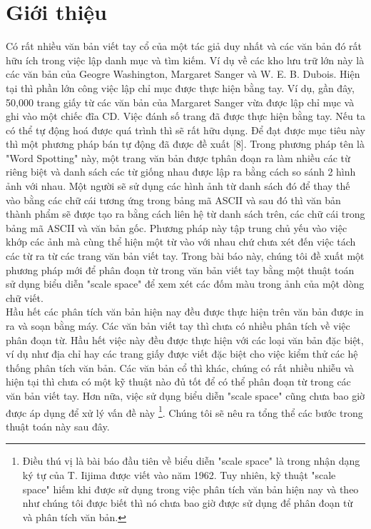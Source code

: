 \documentclass[a4paper]{article}
\begin{document}
\section{Giới thiệu}
Có rất nhiều văn bản viết tay cổ của một tác giả duy nhất và các văn bản đó rất hữu ích trong việc lập danh mục và tìm kiếm. Ví dụ về các kho lưu trữ lớn này là các văn bản của Geogre Washington, Margaret Sanger và W. E. B. Dubois. Hiện tại thì phần lớn công việc lập chỉ mục được thực hiện bằng tay. Ví dụ, gần đây, 50,000 trang giấy từ các văn bản của Margaret Sanger vừa được lập chỉ mục và ghi vào một chiếc đĩa CD. Việc đánh số trang đã được thực hiện bằng tay. Nếu ta có thể tự động hoá được quá trình thì sẽ rất hữu dụng. Để đạt được mục tiêu này thì một phương pháp bán tự động đã được đề xuất [8]. Trong phương pháp tên là "Word Spotting" này, một trang văn bản được tphân đoạn ra làm nhiều các từ riêng biệt và danh sách các từ giống nhau được lập ra bằng cách so sánh 2 hình ảnh với nhau. Một người sẽ sử dụng các hình ảnh từ danh sách đó để thay thế vào bằng các chữ cái tương ứng trong bảng mã ASCII và sau đó thì văn bản thành phẩm sẽ được tạo ra bằng cách liên hệ từ danh sách trên, các chữ cái trong bảng mã ASCII và văn bản gốc. Phương pháp này tập trung chủ yếu vào việc khớp các ảnh mà cùng thể hiện một từ vào với nhau chứ chưa xét đến việc tách các từ ra từ các trang văn bản viết tay. Trong bài báo này, chúng tôi đề xuất một phương pháp mới để phân đoạn từ trong văn bản viết tay bằng một thuật toán sử dụng biểu diễn "scale space" để xem xét các đốm màu trong ảnh của một dòng chữ viết.\\
Hầu hết các phân tích văn bản hiện nay đều được thực hiện trên văn bản được in ra và soạn bằng máy. Các văn bản viết tay thì chưa có nhiều phân tích về việc phân đoạn từ. Hầu hết việc này đều được thực hiện với các loại văn bản đặc biệt, ví dụ như địa chỉ hay các trang giấy được viết đặc biệt cho việc kiểm thử các hệ thống phân tích văn bản. Các văn bản cổ thì khác, chúng có rất nhiều nhiễu và hiện tại thì chưa có một kỹ thuật nào đủ tốt để có thể phân đoạn từ trong các văn bản viết tay. Hơn nữa, việc sử dụng biểu diễn "scale space" cũng chưa bao giờ được áp dụng để xử lý vấn đề này \footnote{Điều thú vị là bài báo đầu tiên về biểu diễn "scale space" là trong nhận dạng ký tự của T. Iijima được viết vào năm 1962. Tuy nhiên, kỹ thuật "scale space" hiếm khi được sử dụng trong việc phân tích văn bản hiện nay và theo như chúng tôi được biết thì nó chưa bao giờ được sử dụng để phân đoạn từ và phân tích văn bản.}. Chúng tôi sẽ nêu ra tổng thể các bước trong thuật toán này sau đây.\\
\end{document}
